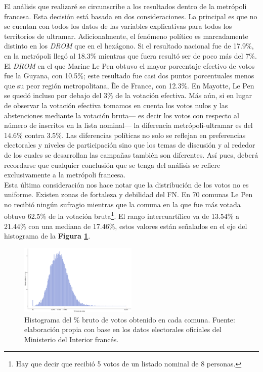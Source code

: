 El análisis que realizaré se circunscribe a los resultados dentro de la metrópoli francesa. Esta decisión está basada en dos consideraciones. La principal es que no se cuentan con todos los datos de las variables explicativas para todos los territorios de ultramar. Adicionalmente, el fenómeno político es marcadamente distinto en los \textit{DROM} que en el hexágono. Si el resultado nacional fue de 17.9\%, en la metrópoli llegó al 18.3\% mientras que fuera resultó ser de poco más del 7\%. El \textit{DROM} en el que Marine Le Pen obtuvo el mayor porcentaje efectivo de votos fue la Guyana, con 10.5\%; este resultado fue casi dos puntos porcentuales menos que su peor región metropolitana, Île de France, con 12.3\%. En Mayotte, Le Pen se quedó incluso por debajo del 3\% de la votación efectiva. Más aún, si en lugar de observar la votación efectiva tomamos en cuenta los votos nulos y las abstenciones mediante la votación bruta--- es decir los votos con respecto al número de inscritos en la lista nominal--- la diferencia metrópoli-ultramar es del 14.6\% contra 3.5\%. Las diferencias políticas no solo se reflejan en preferencias electorales y niveles de participación sino que los temas de discusión y al rededor de los cuales se desarrollan las campañas también son diferentes. Así pues, deberá recordarse que cualquier conclusión que se tenga del análisis se refiere exclusivamente a la metrópoli francesa.\\

Esta última consideración nos hace notar que la distribución de los votos no es uniforme. Existen zonas de fortaleza y debilidad del FN. En 70 comunas Le Pen no recibió ningún sufragio mientras que la comuna en la que fue más votada obtuvo 62.5\% de la votación bruta\footnote{Hay que decir que recibió 5 votos de un listado nominal de 8 personas.}. El rango intercuartílico va de 13.54\% a 21.44\% con una mediana de 17.46\%, estos valores están señalados en el eje del histograma de la \textbf{Figura \ref{fig:Distr_Br}}.\\ 

\begin{figure}[h]
	\centering
	\includegraphics[width = 0.5\textwidth]{Figs/AED/Distr_Votos_Br_P12_FN}
	\caption{Histograma del \% bruto de votos obtenido en cada comuna. Fuente: elaboración propia con base en los datos electorales oficiales del Ministerio del Interior francés.}
	\label{fig:Distr_Br}	
\end{figure}


